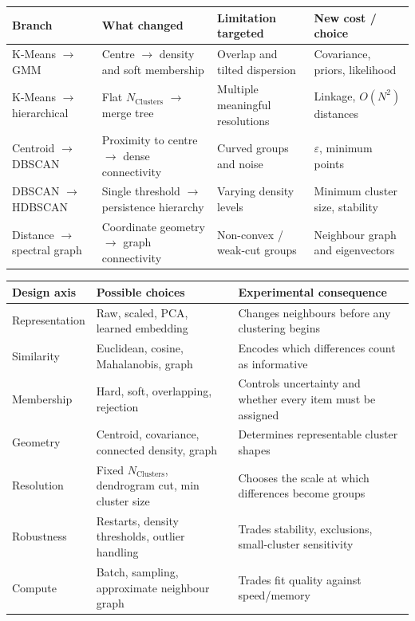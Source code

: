 \begin{center}
\begingroup\ULtight\small
\begin{tabular}{@{}p{.18\linewidth}p{.26\linewidth}p{.30\linewidth}p{.19\linewidth}@{}}
\hline
\textbf{Branch} & \textbf{What changed} & \textbf{Limitation targeted} & \textbf{New cost / choice}\\\hline
K-Means $\to$ GMM & Centre $\to$ density and soft membership & Overlap and tilted dispersion & Covariance, priors, likelihood\\
K-Means $\to$ hierarchical & Flat $N_{\text{Clusters}}$ $\to$ merge tree & Multiple meaningful resolutions & Linkage, $O(N^2)$ distances\\
Centroid $\to$ DBSCAN & Proximity to centre $\to$ dense connectivity & Curved groups and noise & $\varepsilon$, minimum points\\
DBSCAN $\to$ HDBSCAN & Single threshold $\to$ persistence hierarchy & Varying density levels & Minimum cluster size, stability\\
Distance $\to$ spectral graph & Coordinate geometry $\to$ graph connectivity & Non-convex / weak-cut groups & Neighbour graph and eigenvectors\\\hline
\end{tabular}
\label{tab:evolution}
\endgroup
\end{center}

\begin{center}
\begingroup\ULtight\small
\begin{tabular}{@{}p{.21\linewidth}p{.28\linewidth}p{.44\linewidth}@{}}
\hline
\textbf{Design axis} & \textbf{Possible choices} & \textbf{Experimental consequence}\\\hline
Representation & Raw, scaled, PCA, learned embedding & Changes neighbours before any clustering begins\\
Similarity & Euclidean, cosine, Mahalanobis, graph & Encodes which differences count as informative\\
Membership & Hard, soft, overlapping, rejection & Controls uncertainty and whether every item must be assigned\\
Geometry & Centroid, covariance, connected density, graph & Determines representable cluster shapes\\
Resolution & Fixed $N_{\text{Clusters}}$, dendrogram cut, min cluster size & Chooses the scale at which differences become groups\\
Robustness & Restarts, density thresholds, outlier handling & Trades stability, exclusions, small-cluster sensitivity\\
Compute & Batch, sampling, approximate neighbour graph & Trades fit quality against speed/memory\\\hline
\end{tabular}
\caption{Degrees of experiment: vary the representation and assumptions before over-optimising an individual algorithm.}\label{tab:knobs}
\endgroup
\end{center}



